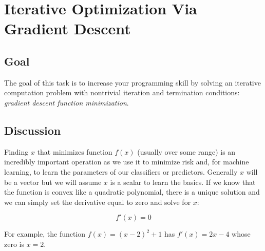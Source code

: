 \chapter{Iterative Optimization Via Gradient Descent}

\section{Goal}

\begin{fullwidth}

The goal of this task is to increase your programming skill by solving an iterative computation problem with nontrivial iteration and termination conditions: {\em gradient descent function minimization}.

\section{Discussion}

Finding $x$ that minimizes function $f(x)$ (usually over some range) is an incredibly important operation as we use it to minimize risk and, for machine learning, to learn the parameters of our classifiers or predictors. Generally $x$ will be a vector but we will assume $x$ is a scalar to learn the basics. If we know that the function is convex like a quadratic polynomial, there is a unique solution and we can simply set the derivative equal to zero and solve for $x$:

\[\tag{Analytic solution to optimization}
f'(x) = 0
\]

\noindent For example, the function $f(x) = (x-2)^2 + 1$ has $f'(x) = 2x - 4$ whose zero is $x=2$.



\end{fullwidth}
